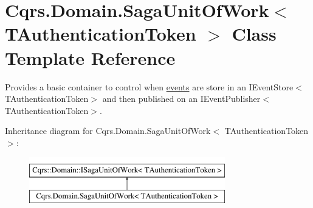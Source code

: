\hypertarget{classCqrs_1_1Domain_1_1SagaUnitOfWork}{}\section{Cqrs.\+Domain.\+Saga\+Unit\+Of\+Work$<$ T\+Authentication\+Token $>$ Class Template Reference}
\label{classCqrs_1_1Domain_1_1SagaUnitOfWork}


Provides a basic container to control when \hyperlink{}{events} are store in an I\+Event\+Store$<$\+T\+Authentication\+Token$>$ and then published on an I\+Event\+Publisher$<$\+T\+Authentication\+Token$>$.  


Inheritance diagram for Cqrs.\+Domain.\+Saga\+Unit\+Of\+Work$<$ T\+Authentication\+Token $>$\+:\begin{figure}[H]
\begin{center}
\leavevmode
\includegraphics[height=2.000000cm]{classCqrs_1_1Domain_1_1SagaUnitOfWork}
\end{center}
\end{figure}

